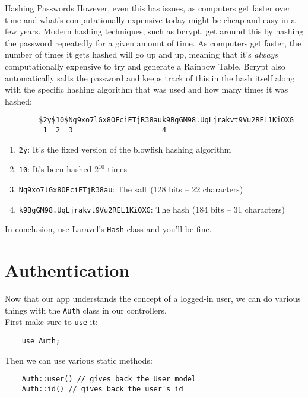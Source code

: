 \begin{infobox}{Hashing Passwords}
    However, even this has issues, as computers get faster over time and what's computationally expensive today might be cheap and easy in a few years. Modern hashing techniques, such as bcrypt, get around this by hashing the password repeatedly for a given amount of time. As computers get faster, the number of times it gets hashed will go up and up, meaning that it's \textit{always} computationally expensive to try and generate a Rainbow Table. Bcrypt also automatically salts the password and keeps track of this in the hash itself along with the specific hashing algorithm that was used and how many times it was hashed:

    \begin{verbatim}
        $2y$10$Ng9xo7lGx8OFciETjR38auk9BgGM98.UqLjrakvt9Vu2REL1KiOXG
         1  2  3                     4
    \end{verbatim}

    \begin{enumerate}
        \item \texttt{2y}: It's the fixed version of the blowfish hashing algorithm
        \item \texttt{10}: It's been hashed $2^{10}$ times
        \item \texttt{Ng9xo7lGx8OFciETjR38au}: The salt (128 bits – 22 characters)
        \item \texttt{k9BgGM98.UqLjrakvt9Vu2REL1KiOXG}: The hash (184 bits – 31 characters)
    \end{enumerate}

    In conclusion, use Laravel's \texttt{Hash} class and you'll be fine.
\end{infobox}


\section{Authentication}

Now that our app understands the concept of a logged-in user, we can do various things with the \texttt{Auth} class in our controllers.
\\

First make sure to \texttt{use} it:

\begin{verbatim}
    use Auth;
\end{verbatim}

Then we can use various static methods:

\begin{verbatim}
    Auth::user() // gives back the User model
    Auth::id() // gives back the user's id
\end{verbatim}


